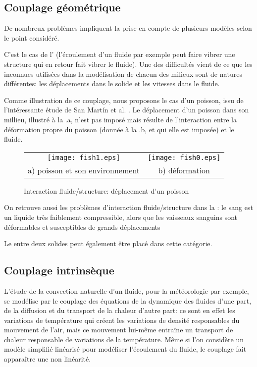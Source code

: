 \medskip
\subsection{Couplage géométrique}
De nombreux problèmes impliquent la prise en compte de plusieurs modèles selon le point considéré.

C'est le cas de l' (l'écoulement d'un fluide par exemple peut faire vibrer une structure qui en retour fait vibrer le fluide). Une des difficultés vient de ce que les inconnues utilisées dans la modélisation de chacun des milieux sont de natures différentes: les déplacements dans le solide et les vitesses dans le fluide.

Comme illustration de ce couplage, nous proposons le cas d'un poisson, issu de l'intéressante étude de San Mart\'in et al. \cite{bib-Fish}. Le déplacement d'un poisson dans son millieu, illustré à la .a, n'est pas imposé mais résulte de l'interaction entre la déformation propre du poisson (donnée à la .b, et qui elle est imposée) et le fluide.
\begin{figure}[htb]
\begin{center}
 \begin{tabular}{cc}
  \texttt{[image: fish1.eps]} &%
  \texttt{[image: fish0.eps]}\\
  a) poisson et son environnement & b) déformation
 \end{tabular}
\end{center}
\caption{Interaction fluide/structure: déplacement d'un poisson}
\label{Fig-fish}
\end{figure}

On retrouve aussi les problèmes d'interaction fluide/structure dans la : le sang est un liquide très faiblement compressible, alors que les vaisseaux sanguins sont déformables et susceptibles de grands déplacements

Le  entre deux solides peut également être placé dans cette catégorie.


\medskip
\subsection{Couplage intrinsèque}

L'étude de la convection naturelle d'un fluide, pour la météorologie par exemple, se modélise par le couplage des équations de la dynamique des fluides d'une part, de la diffusion et du transport de la chaleur d'autre part: ce sont en effet les variations de température qui créent les variations de densité responsables du mouvement de l'air, mais ce mouvement lui-même entraîne un transport de chaleur responsable de variations de la température. Même si l'on considère un modèle simplifié linéarisé pour modéliser l'écoulement du fluide, le couplage fait apparaître une non linéarité.

